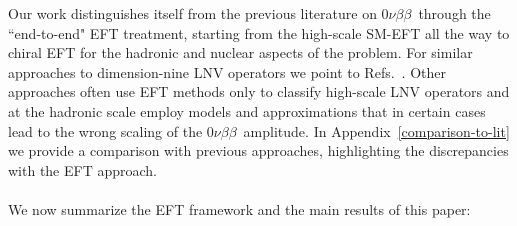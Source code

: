 \documentclass[letterpaper,11pt]{article}
\newcommand{\NLDBD}{$0 \nu \beta \beta$}
\begin{document}
Our work distinguishes itself from the previous literature on \NLDBD\ through the ``end-to-end"  EFT treatment, 
starting from the high-scale SM-EFT all the way to chiral EFT for the hadronic and nuclear aspects of the problem.   
For  similar approaches to  dimension-nine LNV operators  we point to Refs.~\cite{Prezeau:2003xn,Graesser:2016bpz}.  
Other approaches often use EFT methods only to classify high-scale LNV operators and at the hadronic scale  employ models and approximations 
that in certain cases lead to  the wrong scaling of the  \NLDBD\ amplitude.   
In Appendix~\ref{comparison-to-lit} we provide a comparison with previous approaches, highlighting the discrepancies with the EFT approach. 
\\
\\
We now summarize  the EFT framework and the main results of this paper:
\end{document}
